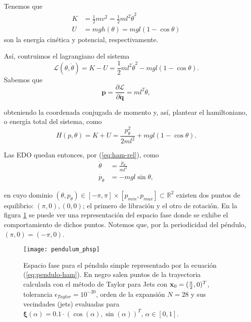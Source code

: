 Tenemos que 
\begin{align}
 K &= \frac{1}{2}m v^2 = \frac{1}{2} m l^2 \dot{\theta}^2 \nonumber \\
 U &= mgh(\theta) = mgl\left(1 - \cos{\theta} \right)
\end{align}
son la energía cinética y potencial, respectivamente. 

Así, contruimos el lagrangiano del sistema
\begin{equation*}
 \mathcal{L}(\theta,\dot{\theta}) = K - U = \frac{1}{2} m l^2 \dot{\theta}^2 - mgl\left(1 - \cos{\theta} \right).
\end{equation*}
Sabemos que
\begin{equation*}
 \mathbf{p} = \frac{\partial \mathcal{L}}{\partial \mathbf{\dot{q}}} = ml^2\dot{\theta},
\end{equation*}

obteniendo la coordenada conjugada de momento y, así, plantear el hamiltoniano, o energía total del sistema, como
\begin{equation}
 H(p,\theta) = K + U = \frac{p_{\theta}^2}{2ml^2} + mgl\left(1 - \cos{\theta} \right).
\label{eq:pendulo-ham}
\end{equation}
 
Las EDO quedan entonces, por (\ref{eq:ham-rel}), como
\begin{align}
 \dot{\theta} &= \frac{p_{\theta}}{ml^2} \nonumber \\
 \dot{p_{\theta}} &= -mgl\sin{\theta},
\label{eq:pendulo-ode}
\end{align}

en cuyo dominio $(\theta,p_{\theta}) \in [-\pi,\pi]\times[p_{min},p_{max}] \subset \mathbb{R}^2$ existen dos puntos de equilibrio: $(\pi,0), (0,0)$; el primero de libración y el otro de rotación. En la figura \ref{fig:pendulum_pshp} se puede ver una representación del espacio fase donde se exhibe el comportamiento de dichos puntos. Notemos que, por la periodicidad del péndulo, $(\pi, 0) = (-\pi, 0)$.

\begin{figure}[h!]
 \centering
 \texttt{[image: pendulum\_phsp]}
 \caption{Espacio fase para el péndulo simple representado por la ecuación (\ref{eq:pendulo-ham}). En negro salen puntos de la trayectoria calculada con el método de Taylor para Jets con $\mathbf{x}_0 = (\frac{\pi}{2},0)^T$, tolerancia $\epsilon_{Taylor} = 10^{-20}$, orden de la expansión $N = 28$ y sus vecindades (jets) evaluadas para $\mathbf{\xi}(\alpha) = 0.1\cdot \left( \cos(\alpha), \sin(\alpha) \right)^T$, $\alpha \in [0,1]$.}
\label{fig:pendulum_pshp}
\end{figure}

